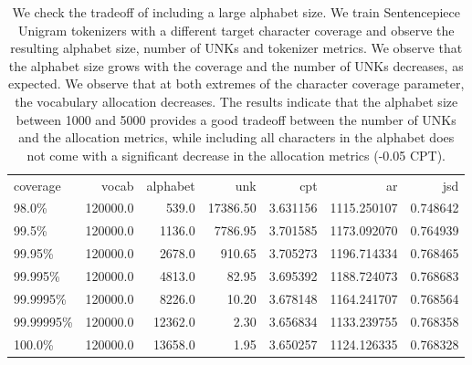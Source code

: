 \begin{table}
\centering
\caption{We check the tradeoff of including a large alphabet size. We train Sentencepiece Unigram tokenizers with a different target character coverage and observe the resulting alphabet size, number of UNKs and tokenizer metrics. We observe that the alphabet size grows with the coverage and the number of UNKs decreases, as expected. We observe that at both extremes of the character coverage parameter, the vocabulary allocation decreases. The results indicate that the alphabet size between 1000 and 5000 provides a good tradeoff between the number of UNKs and the allocation metrics, while including all characters in the alphabet does not come with a significant decrease in the allocation metrics (-0.05 CPT).}
\label{tab:coverage_influence}
\begin{tabular}{lrrrrrr}
\toprule
 coverage &    vocab &  alphabet &      unk &      cpt &          ar &      jsd \\
    98.0\% & 120000.0 &     539.0 & 17386.50 & 3.631156 & 1115.250107 & 0.748642 \\
\midrule
    99.5\% & 120000.0 &    1136.0 &  7786.95 & 3.701585 & 1173.092070 & 0.764939 \\
   99.95\% & 120000.0 &    2678.0 &   910.65 & 3.705273 & 1196.714334 & 0.768465 \\
  99.995\% & 120000.0 &    4813.0 &    82.95 & 3.695392 & 1188.724073 & 0.768683 \\
 99.9995\% & 120000.0 &    8226.0 &    10.20 & 3.678148 & 1164.241707 & 0.768564 \\
99.99995\% & 120000.0 &   12362.0 &     2.30 & 3.656834 & 1133.239755 & 0.768358 \\
   100.0\% & 120000.0 &   13658.0 &     1.95 & 3.650257 & 1124.126335 & 0.768328 \\
\bottomrule
\end{tabular}
\end{table}
